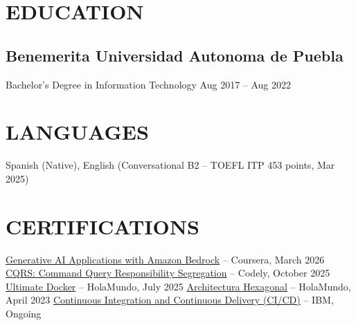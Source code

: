 \documentclass[a4paper,10pt]{article}
\begin{document}
\section*{EDUCATION}

\subsection*{\small Benemerita Universidad Autonoma de Puebla}
Bachelor's Degree in Information Technology \hfill Aug 2017 -- Aug 2022

\section*{LANGUAGES}
Spanish (Native), English (Conversational B2 -- TOEFL ITP 453 points, Mar 2025)

\section*{CERTIFICATIONS}
    \href{https://coursera.org/verify/HEG7YFDO6D1C}{Generative AI Applications with Amazon Bedrock} -- Coursera, March 2026
    \href{https://www.linkedin.com/in/jose-carlos-huerta-garcia-773952212/details/certifications}{CQRS: Command Query Responsibility Segregation} -- Codely, October 2025
    \href{https://academia.holamundo.io/certificates/fifvbfywmp}{Ultimate Docker} -- HolaMundo, July 2025
    \href{https://www.linkedin.com/in/jose-carlos-huerta-garcia-773952212/details/certifications/1758852008410/single-media-viewer/?profileId=ACoAADXjsscBqtjtdk4S_qpdkHwZs, Fn9y9TiG0o}{Architectura Hexagonal} -- HolaMundo, April 2023
    \href{https://www.coursera.org/programs/knu-high-o3k80/learn/continuous-integration-and-continuous-delivery-ci-cd?source=search}{Continuous Integration and Continuous Delivery (CI/CD)} -- IBM, Ongoing
\end{document}
